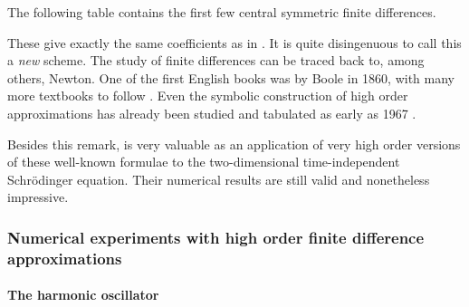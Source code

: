 The following table contains the first few central symmetric finite differences.
\begin{center}
    
\end{center}

These give exactly the same coefficients as in \cite{wang_new_2009}. It is quite disingenuous to call this a \emph{new} scheme. The study of finite differences can be traced back to, among others, Newton. One of the first English books was by Boole \cite{boole_calculus_1860} in 1860, with many more textbooks to follow \cite{thomson_calculus_1933,jordan_calculus_1965}. Even the symbolic construction of high order approximations has already been studied and tabulated as early as 1967 \cite{ballester_construction_1967,keller_symbolic_1978,fornberg_generation_1988}.

Besides this remark, \cite{wang_new_2009} is very valuable as an application of very high order versions of these well-known formulae to the two-dimensional time-independent Schrödinger equation. Their numerical results are still valid and nonetheless impressive.

\subsubsection{Numerical experiments with high order finite difference approximations}\label{sec:c4_fd_numerical}

\paragraph{The harmonic oscillator}

